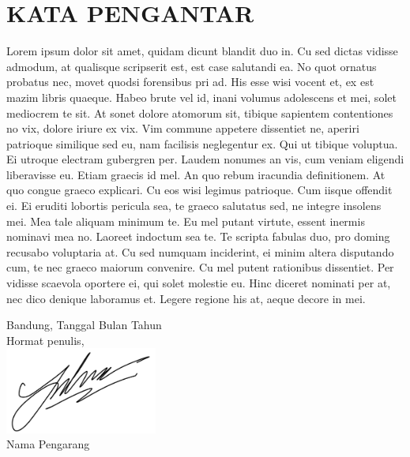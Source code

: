 \chapter*{KATA PENGANTAR}
Lorem ipsum dolor sit amet, quidam dicunt blandit duo in. Cu sed dictas vidisse admodum, at qualisque scripserit est, est case salutandi ea. No quot ornatus probatus nec, movet quodsi forensibus pri ad. His esse wisi vocent et, ex est mazim libris quaeque. Habeo brute vel id, inani volumus adolescens et mei, solet mediocrem te sit.
At sonet dolore atomorum sit, tibique sapientem contentiones no vix, dolore iriure ex vix. Vim commune appetere dissentiet ne, aperiri patrioque similique sed eu, nam facilisis neglegentur ex. Qui ut tibique voluptua. Ei utroque electram gubergren per. Laudem nonumes an vis, cum veniam eligendi liberavisse eu. Etiam graecis id mel.
An quo rebum iracundia definitionem. At quo congue graeco explicari. Cu eos wisi legimus patrioque. Cum iisque offendit ei.
Ei eruditi lobortis pericula sea, te graeco salutatus sed, ne integre insolens mei. Mea tale aliquam minimum te. Eu mel putant virtute, essent inermis nominavi mea no. Laoreet indoctum sea te. Te scripta fabulas duo, pro doming recusabo voluptaria at. Cu sed numquam inciderint, ei minim altera disputando cum, te nec graeco maiorum convenire.
Cu mel putent rationibus dissentiet. Per vidisse scaevola oportere ei, qui solet molestie eu. Hinc diceret nominati per at, nec dico denique laboramus et. Legere regione his at, aeque decore in mei.

\hfill{
\begin{flushright} Bandung, Tanggal Bulan Tahun\\
Hormat  penulis,\\
\includegraphics[width=5cm]{img/sign.png}\\
Nama Pengarang
\end{flushright}}